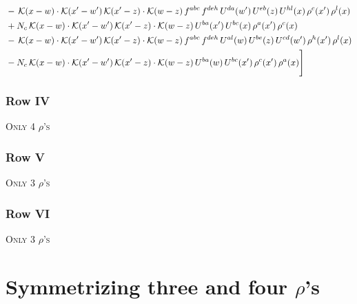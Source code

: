 \documentclass[9pt]{article}
\numberwithin{equation}{section}
\begin{document}
\begin{align}
&-\,\mathcal{K}(x-w)\cdot\mathcal{K}(x'-w')\,\mathcal{K}(x'-z)\cdot\mathcal{K}(w-z)\,f^{abc}\,f^{deh}\,U^{da}(w')\,U^{eb}(z)\,U^{hl}(x)\,\rho^{c}(x')\,\rho^{l}(x)\notag\\
&+N_{c}\,\mathcal{K}(x-w)\cdot\mathcal{K}(x'-w')\,\mathcal{K}(x'-z)\cdot\mathcal{K}(w-z)\,U^{ba}(x')\,U^{bc}(x)\,\rho^{a}(x')\,\rho^{c}(x)\notag\\
&-\,\mathcal{K}(x-w)\cdot\mathcal{K}(x'-w')\,\mathcal{K}(x'-z)\cdot\mathcal{K}(w-z)\,f^{abc}\,f^{deh}\,U^{al}(w)\,U^{be}(z)\,U^{cd}(w')\,\rho^{h}(x')\,\rho^{l}(x)\notag\\
&-N_{c}\,\mathcal{K}(x-w)\cdot\mathcal{K}(x'-w')\,\mathcal{K}(x'-z)\cdot\mathcal{K}(w-z)\,U^{ba}(w)\,U^{bc}(x')\,\rho^{c}(x')\,\rho^{a}(x)\Bigg]
\end{align}
\subsubsection{Row IV}
\textsc{Only 4 $\rho$'s}
\subsubsection{Row V}
\textsc{Only 3 $\rho$'s}
\subsubsection{Row VI}
\textsc{Only 3 $\rho$'s}
\section{Symmetrizing three and four $\rho$'s} 
\end{document}
